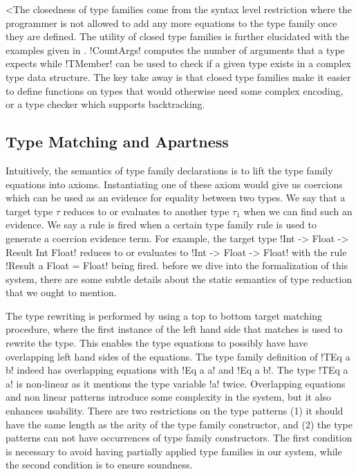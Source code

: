 \documentclass[format=acmsmall,manuscript,review,screen,nonacm,margin=1in,11pt]{acmart}
\begin{document}
<The closedness of type families come from the syntax level restriction
where the programmer is not allowed to add any more equations to the type family once
they are defined. %
The utility of closed type families is further elucidated with the examples
given in . !CountArgs! computes the number of arguments that a type expects while
!TMember! can be used to check if a given type exists in a complex type data structure.
The key take away is that closed type families make it easier to define functions on types
that would otherwise need some complex encoding, or a type checker which supports backtracking.

\subsection{Type Matching and Apartness}\label{subsec:tf-closed-apartness}
Intuitively, the semantics of type family declarations is to lift the type family equations into axioms.
Instantiating one of these axiom would give us coercions which can be
used as an evidence for equality between two types. We say that a target type $\tau$
reduces to or evaluates to another type $\tau_1$ when we can
find such an evidence. We say a rule is fired when a certain type family rule is used
to generate a coercion evidence term. For example, the target type !Int -> Float -> Result Int Float!
reduces to or evaluates to !Int -> Float -> Float! with the rule !Result a Float = Float! being fired.
before we dive into the formalization of this system, there are some subtle details about
the static semantics of type reduction that we ought to mention.%

The type rewriting is performed by using a top to bottom target matching procedure,
where the first instance of the left hand side that matches is used to rewrite the type.
This enables the type equations to possibly have have overlapping left hand sides of the equations.  
The type family definition of !TEq a b! indeed has overlapping equations with !Eq a a! and !Eq a b!.
The type !TEq a a! is non-linear as it mentions the type variable !a! twice.
Overlapping equations and non linear patterns introduce some complexity in the system, but it also
enhances usability. There are two restrictions on the type patterns
(1) it should  have the same length as the arity of the type family constructor, and
(2) the type patterns can not have occurrences of type family constructors.
The first condition is necessary to avoid having partially applied type families in our system,
while the second condition is to ensure soundness.
\end{document}
